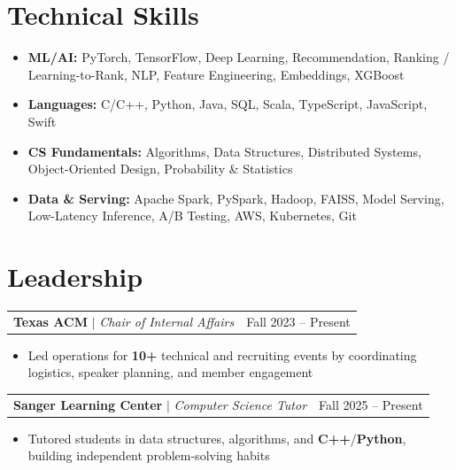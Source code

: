 \documentclass[letterpaper,10pt]{article}
\makeatletter
\newcommand{\resumeWorkHeading}[2]{%
  \vspace{2pt}\noindent
  \begin{tabular*}{\textwidth}{@{}l@{\extracolsep{\fill}}r@{}}
    #1 & #2 \\
  \end{tabular*}%
  \vspace{-2pt}
}
\newcommand{\resumeItemListStart}{\begin{itemize}}
\newcommand{\resumeItemListEnd}{\end{itemize}\vspace{3pt}}
\newcommand{\resumeItem}[1]{\item #1}
\makeatother
\begin{document}
\section{Technical Skills}
\begin{itemize}[leftmargin=0em,label={},itemsep=1pt,parsep=0pt,topsep=2pt]
\item \textbf{ML/AI:} PyTorch, TensorFlow, Deep Learning, Recommendation, Ranking / Learning-to-Rank, NLP, Feature Engineering, Embeddings, XGBoost
\item \textbf{Languages:} C/C++, Python, Java, SQL, Scala, TypeScript, JavaScript, Swift
\item \textbf{CS Fundamentals:} Algorithms, Data Structures, Distributed Systems, Object-Oriented Design, Probability \& Statistics
\item \textbf{Data \& Serving:} Apache Spark, PySpark, Hadoop, FAISS, Model Serving, Low-Latency Inference, A/B Testing, AWS, Kubernetes, Git
\end{itemize}

\section{Leadership}
\resumeWorkHeading
{\textbf{Texas ACM} $|$ \emph{Chair of Internal Affairs}}{Fall 2023 -- Present}
\resumeItemListStart
\resumeItem{Led operations for \textbf{10+} technical and recruiting events by coordinating logistics, speaker planning, and member engagement}
\resumeItemListEnd

\resumeWorkHeading
{\textbf{Sanger Learning Center} $|$ \emph{Computer Science Tutor}}{Fall 2025 -- Present}
\resumeItemListStart
\resumeItem{Tutored students in data structures, algorithms, and \textbf{C++}/\textbf{Python}, building independent problem-solving habits}
\resumeItemListEnd
\end{document}

